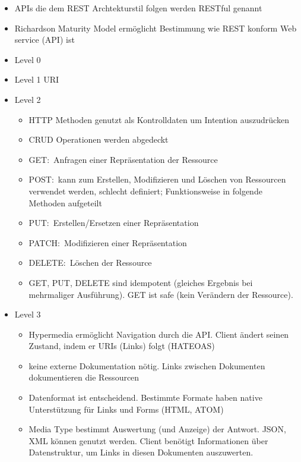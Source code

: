 \begin{itemize}
  \item APIs die dem REST Archtekturstil folgen werden RESTful genannt
  \item Richardson Maturity Model ermöglicht Bestimmung wie REST konform Web service (API) ist
  \item Level 0
  \item Level 1
  URI
  \item Level 2
  \begin{itemize}
    \item HTTP Methoden genutzt als Kontrolldaten um Intention auszudrücken
    \item CRUD Operationen werden abgedeckt
    \item GET:\ Anfragen einer Repräsentation der Ressource
    \item POST:\ kann zum Erstellen, Modifizieren und Löschen von Ressourcen verwendet werden, schlecht definiert; Funktionsweise in folgende Methoden aufgeteilt
    \item PUT:\ Erstellen/Ersetzen einer Repräsentation
    \item PATCH:\ Modifizieren einer Repräsentation
    \item DELETE:\ Löschen der Ressource
    \item GET, PUT, DELETE sind idempotent (gleiches Ergebnis bei mehrmaliger Ausführung). GET ist safe (kein Verändern der Ressource).
  \end{itemize}
  \item Level 3
  \begin{itemize}
    \item Hypermedia ermöglicht Navigation durch die API\@. Client ändert seinen Zustand, indem er URIs (Links) folgt (HATEOAS)
    \item keine externe Dokumentation nötig. Links zwischen Dokumenten dokumentieren die Ressourcen
    \item Datenformat ist entscheidend. Bestimmte Formate haben native Unterstützung für Links und Forms (HTML, ATOM)
    \item Media Type bestimmt Auswertung (und Anzeige) der Antwort. JSON, XML können genutzt werden. Client benötigt Informationen über Datenstruktur, um Links in diesen Dokumenten auszuwerten.
  \end{itemize}
\end{itemize}

